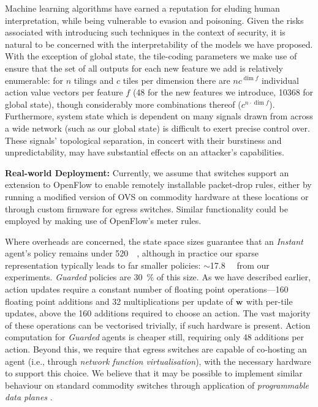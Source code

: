 \documentclass[10pt, times, comsoc]{IEEEtran}
\newcommand{\wvec}[1]{\ensuremath{\bm{w}_{#1}}}
\newcommand{\fakepara}[1]{\noindent\textbf{#1:}}
\begin{document}
Machine learning algorithms have earned a reputation for eluding human interpretation, while being vulnerable to evasion and poisoning.
Given the risks associated with introducing such techniques in the context of security, it is natural to be concerned with the interpretability of the models we have proposed.
With the exception of global state, the tile-coding parameters we make use of ensure that the set of all outputs for each new feature we add is relatively enumerable: for $n$ tilings and $c$ tiles per dimension there are $nc^{\dim{f}}$ individual action value vectors per feature $f$ (\num{48} for the new features we introduce, \num{10368} for global state), though considerably more combinations thereof ($c^{n \cdot \dim{f}}$).
Furthermore, system state which is dependent on many signals drawn from across a wide network (such as our global state) is difficult to exert precise control over.
These signals' topological separation, in concert with their burstiness and unpredictability, may have substantial effects on an attacker's capabilities.

\fakepara{Real-world Deployment}
Currently, we assume that switches support an extension to OpenFlow to enable remotely installable packet-drop rules, either by running a modified version of OVS on commodity hardware at these locations or through custom firmware for egress switches.
Similar functionality could be employed by making use of OpenFlow's meter rules.

Where overheads are concerned, the state space sizes guarantee that an \emph{Instant} agent's policy remains under \SI{520}{\kibi\byte}, although in practice our sparse representation typically leads to far smaller policies: $\sim$\SI{17.8}{\kibi\byte} from our experiments.
\emph{Guarded} policies are \SI{30}{\percent} of this size.
As we have described earlier, action updates require a constant number of floating point operations---\num{160} floating point additions and \num{32} multiplications per update of $\wvec{}$ with per-tile updates, above the \num{160} additions required to choose an action.
The vast majority of these operations can be vectorised trivially, if such hardware is present.
Action computation for \emph{Guarded} agents is cheaper still, requiring only \num{48} additions per action.
Beyond this, we require that egress switches are capable of co-hosting an agent (i.e., through \emph{network function virtualisation}), with the necessary hardware to support this choice.
We believe that it may be possible to implement similar behaviour on standard commodity switches through application of \emph{programmable data planes} \cite{DBLP:conf/ancs/JouetP17}.
\end{document}
